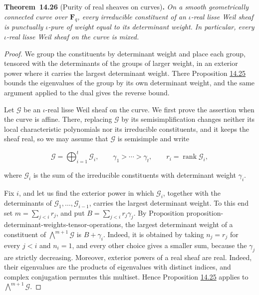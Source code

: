 \documentclass[11pt]{article}
\newenvironment{bpstatement}[2]{\par\addvspace{0.6\baselineskip}\noindent\textbf{#1}#2\textbf{.}\enspace\ignorespaces}
  {\par\addvspace{0.4\baselineskip}}
\newenvironment{bpstatementit}[2]{\begin{bpstatement}{#1}{#2}\itshape\ignorespaces}{\end{bpstatement}}
\begin{document}
\label{bp82}%
\begin{bpstatementit}{Theorem~14.26}{ (Purity of real sheaves on curves)}
On a smooth geometrically connected curve over \(\mathbf F_q\), every irreducible constituent of an \(\iota\)-real lisse Weil sheaf is punctually \(\iota\)-pure of weight equal to its determinant weight. In particular, every \(\iota\)-real lisse Weil sheaf on the curve is mixed.
\end{bpstatementit}

\begin{proof}[{Proof}]\label{bp83}%
We group the constituents by determinant weight and place each group, tensored with the determinants of the groups of larger weight, in an exterior power where it carries the largest determinant weight. There Proposition \hyperref[bp78]{14.25} bounds the eigenvalues of the group by its own determinant weight, and the same argument applied to the dual gives the reverse bound.

Let \(\mathcal G\) be an \(\iota\)-real lisse Weil sheaf on the curve. We first prove the assertion when the curve is affine. There, replacing \(\mathcal G\) by its semisimplification changes neither its local characteristic polynomials nor its irreducible constituents, and it keeps the sheaf real, so we may assume that \(\mathcal G\) is semisimple and write

\[
\mathcal G=\bigoplus_{i=1}^t\mathcal G_i,
\qquad \gamma_1>\cdots>\gamma_t,
\qquad r_i=\operatorname{rank}\mathcal G_i,
\]

where \(\mathcal G_i\) is the sum of the irreducible constituents with determinant weight \(\gamma_i\).

Fix \(i\), and let us find the exterior power in which \(\mathcal G_i\), together with the determinants of \(\mathcal G_1,\dots,\mathcal G_{i-1}\), carries the largest determinant weight. To this end set \(m=\sum_{j<i}r_j\), and put \(B=\sum_{j<i}r_j\gamma_j\).  By Proposition proposition-determinant-weights-tensor-operations, the largest determinant weight of a constituent of \(\bigwedge^{m+1}\mathcal G\) is \(B+\gamma_i\).  Indeed, it is obtained by taking \(n_j=r_j\) for every \(j<i\) and \(n_i=1\), and every other choice gives a smaller sum, because the \(\gamma_j\) are strictly decreasing.  Moreover, exterior powers of a real sheaf are real. Indeed, their eigenvalues are the products of eigenvalues with distinct indices, and complex conjugation permutes this multiset.  Hence Proposition \hyperref[bp78]{14.25} applies to \(\bigwedge^{m+1}\mathcal G\).


\end{proof}
\end{document}
